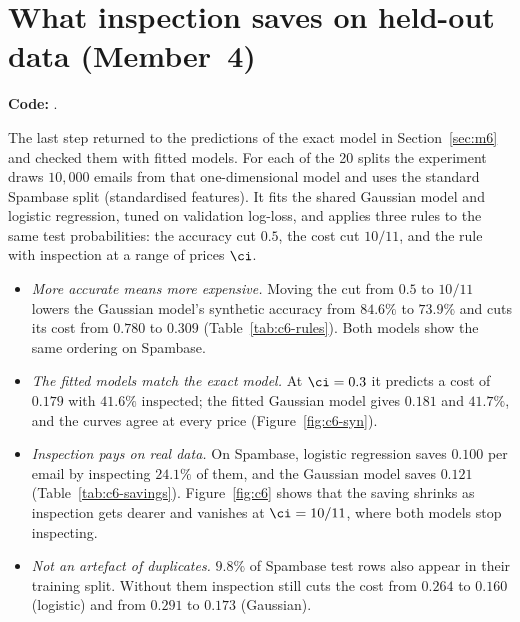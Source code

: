 \section{What inspection saves on held-out data (Member~4)}
\label{sec:m4}
\textbf{Code:} .

The last step returned to the predictions of the exact model in Section~\ref{sec:m6} and checked them
with fitted models. For each of the 20 splits the experiment draws $10{,}000$ emails from that
one-dimensional model and uses the standard Spambase split (standardised features). It fits the shared
Gaussian model and logistic regression, tuned on validation log-loss, and applies three rules to the
same test probabilities: the accuracy cut $0.5$, the cost cut $10/11$, and the rule with inspection at
a range of prices $\ci$.

\begin{table}[!htbp]
\centering\small

\caption{Accuracy and cost per email of the two automatic rules on test data
(mean $\pm$ standard error, 20 splits, $\cfp=10$, $\cfn=1$).}
\label{tab:c6-rules}
\end{table}

\begin{table}[!htbp]
\centering\small

\caption{Inspection at $\ci=0.3$: cost of the best automatic rule, cost with inspection, the paired
saving and the share of emails inspected.}
\label{tab:c6-savings}
\end{table}

\begin{itemize}
  \item \emph{More accurate means more expensive.} Moving the cut from $0.5$ to $10/11$ lowers the
        Gaussian model's synthetic accuracy from $84.6\%$ to $73.9\%$ and cuts its cost from $0.780$ to
        $0.309$ (Table~\ref{tab:c6-rules}). Both models show the same ordering on Spambase.
  \item \emph{The fitted models match the exact model.} At $\ci=0.3$ it predicts a cost of $0.179$
        with $41.6\%$ inspected; the fitted Gaussian model gives $0.181$ and $41.7\%$, and the curves
        agree at every price (Figure~\ref{fig:c6-syn}).
  \item \emph{Inspection pays on real data.} On Spambase, logistic regression saves $0.100$ per email
        by inspecting $24.1\%$ of them, and the Gaussian model saves $0.121$ (Table~\ref{tab:c6-savings}).
        Figure~\ref{fig:c6} shows that the saving shrinks as inspection gets dearer and vanishes at
        $\ci=10/11$, where both models stop inspecting.
  \item \emph{Not an artefact of duplicates.} $9.8\%$ of Spambase test rows also appear in their
        training split. Without them inspection still cuts the cost from $0.264$ to $0.160$ (logistic)
        and from $0.291$ to $0.173$ (Gaussian).
\end{itemize}

